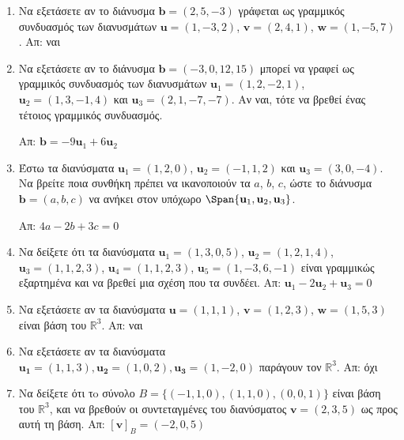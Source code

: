 \begin{enumerate}
  \item\label{ask:eksart2} Να εξετάσετε αν το διάνυσμα $ \mathbf{b} = (2,5,-3) $ 
    γράφεται ως γραμμικός συνδυασμός των διανυσμάτων $ \mathbf{u} = (1,-3,2)$, 
    $ \mathbf{v} = (2,4,1)$, $ \mathbf{w} = (1,-5,7) $.
    \hfill Απ: ναι 

  \item Να εξετάσετε αν το διάνυσμα $ \mathbf{b} = (-3,0,12,15) $ μπορεί να γραφεί 
    ως γραμμικός συνδυασμός των διανυσμάτων $ \mathbf{u}_{1} = (1,2,-2,1) $, 
    $ \mathbf{u}_{2} = (1,3,-1,4) $ και $ \mathbf{u}_{3} = (2,1,-7,-7) $. 
    Αν ναι, τότε να βρεθεί ένας τέτοιος γραμμικός συνδυασμός.

    \hfill Απ: $ \mathbf{b} = -9 \mathbf{u}_{1} + 6 \mathbf{u}_{2} $ 

  \item\label{ask:eksart3} Έστω τα διανύσματα $ \mathbf{u}_{1} = (1,2,0) $, 
    $ \mathbf{u}_{2} = (-1,1,2) $ 
    και $ \mathbf{u}_{3} = (3,0,-4) $. Να βρείτε ποια συνθήκη πρέπει να ικανοποιούν τα 
    $a$, $b$, $c$, ώστε το διάνυσμα $ \mathbf{b} = (a,b,c) $ να ανήκει στον υπόχωρο 
    $ \Span \{ \mathbf{u}_{1}, \mathbf{u}_{2}, \mathbf{u}_{3} \} $.

    \hfill Απ: $ 4a -2b + 3c = 0 $ 

  \item\label{ask:synd} Να δείξετε ότι τα διανύσματα $ \mathbf{u}_{1} = (1,3,0,5) $, 
    $ \mathbf{u}_{2} = (1,2,1,4) $, $ \mathbf{u}_{3} = (1,1,2,3)$, 
    $ \mathbf{u}_{4} = (1,1,2,3) $, $ \mathbf{u}_{5} = (1,-3,6,-1) $ 
    είναι γραμμικώς εξαρτημένα και να βρεθεί μια σχέση που τα συνδέει. 
    \hfill Απ: $ \mathbf{u}_{1} - 2 \mathbf{u}_{2} + \mathbf{u}_{3} = 0 $ 

  \item\label{ask:baseeks} Να εξετάσετε αν τα διανύσματα $ \mathbf{u} = (1,1,1)$, 
    $ \mathbf{v} = (1,2,3)$, $ \mathbf{w} = (1,5,3) $ είναι βάση του $\mathbb{R}^{3}$. 
    \hfill Απ: ναι 

  \item\label{ask:parag} Να εξετάσετε αν τα διανύσματα $ \mathbf{u_{1}} = (1,1,3), 
    \mathbf{u_{2}} = (1,0,2), \mathbf{u_{3}}= (1,-2,0)$ παράγουν τον $ \mathbb{R}^{3} $.
    \hfill Απ: όχι 

  \item Να δείξετε ότι τo σύνολο $ B = \{ (-1,1,0), (1,1,0), 
    (0,0,1) \} $ είναι βάση του 
    $ \mathbb{R}^{3} $, και να βρεθούν οι συντεταγμένες του διανύσματος 
    $ \mathbf{v} = (2,3,5) $ ως προς αυτή τη βάση.
    \hfill Απ: $ [\mathbf{v}]_{B} = (-2,0,5) $ 


\end{enumerate}

